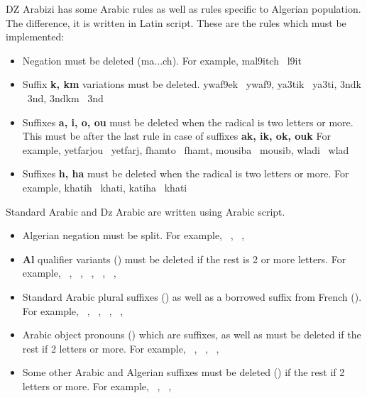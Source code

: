 \documentclass[11pt, a4paper]{article}
\begin{document}
DZ Arabizi has some Arabic rules as well as rules specific to Algerian population. 
The difference, it is written in Latin script.
These are the rules which must be implemented:
\begin{itemize}
	\item Negation must be deleted (ma...ch). For example, mal9itch \textrightarrow\ l9it
	\item Suffix \textbf{k, km} variations must be deleted. ywaf9ek \textrightarrow\ ywaf9, ya3tik \textrightarrow\ ya3ti, 3ndk \textrightarrow\ 3nd, 3ndkm \textrightarrow\ 3nd
	\item Suffixes \textbf{a, i, o, ou} must be deleted when the radical is two letters or more. This must be after the last rule in case of suffixes \textbf{ak, ik, ok, ouk}
	For example, yetfarjou \textrightarrow\ yetfarj, fhamto \textrightarrow\ fhamt, mousiba \textrightarrow\ mousib, wladi \textrightarrow\ wlad
	\item Suffixes \textbf{h, ha} must be deleted when the radical is two letters or more.
	For example, khatih \textrightarrow\ khati, katiha \textrightarrow\ khati
\end{itemize}

Standard Arabic and Dz Arabic are written using Arabic script.
\begin{itemize}
	\item Algerian negation must be split. 
	For example,  \textrightarrow\ ,  \textrightarrow\ ,  \textrightarrow\ 
	\item \textbf{Al} qualifier variants () must be deleted if the rest is 2 or more letters. 
	For example,  \textrightarrow\ ,  \textrightarrow\ ,  \textrightarrow\ ,  \textrightarrow\ ,  \textrightarrow\ ,
	\item Standard Arabic plural suffixes () as well as a borrowed suffix from French ().
	For example,  \textrightarrow\ ,  \textrightarrow\ ,  \textrightarrow\ ,  \textrightarrow\ , 
	\item Arabic object pronouns () which are suffixes, as well as  must be deleted if the rest if 2 letters or more.
	For example,  \textrightarrow\ ,  \textrightarrow\ ,  \textrightarrow\ , 
	\item Some other Arabic and Algerian suffixes must be deleted () if the rest if 2 letters or more. 
	For example,  \textrightarrow\ ,  \textrightarrow\ ,  \textrightarrow\ 
\end{itemize}
\end{document}
